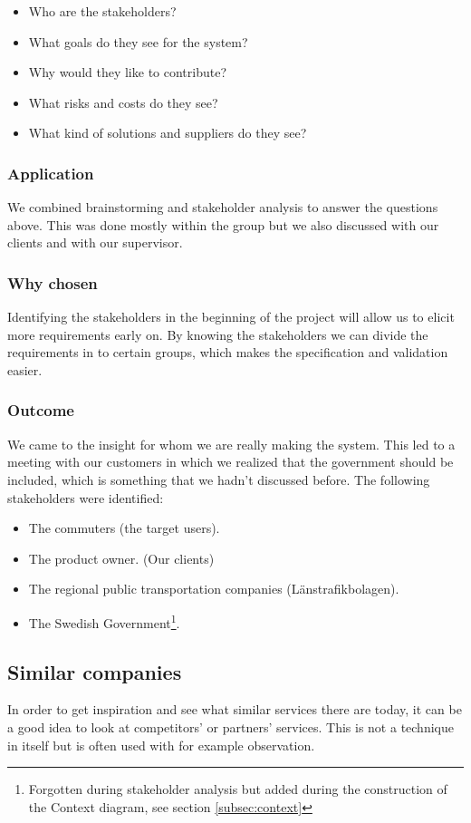 \documentclass[a4paper]{article}
\begin{document}
		\begin{itemize}
			\item Who are the stakeholders?
			\item What goals do they see for the system?
			\item Why would they like to contribute?
			\item What risks and costs do they see?
			\item What kind of solutions and suppliers do they see?
		\end{itemize}
		
		\subsubsection{Application}
 We combined brainstorming and stakeholder analysis to answer the questions above. This was done mostly within the group but we also discussed with our clients and with our supervisor.
		\subsubsection{Why chosen}
		Identifying the stakeholders in the beginning of the project will allow us to elicit more requirements early on. By knowing the stakeholders we can divide the requirements in to certain groups, which makes the specification and validation easier.
		\subsubsection{Outcome}
We came to the insight for whom we are really making the system. This led to a meeting with our customers in which we realized that the government should be included, which is something that we hadn't discussed before.
	The following stakeholders were identified:

		\begin{itemize}
			\item The commuters (the target users).
			\item The product owner. (Our clients)
			\item The regional public transportation companies (Länstrafikbolagen). 
			\item The Swedish Government\footnote{Forgotten during stakeholder analysis but added during the construction of the Context diagram, see section \ref{subsec:context}}.
		\end{itemize}
		
		\subsection{Similar companies}
			In order to get inspiration and see what similar services there are today, it can be a good idea to look at competitors' or partners' services. This is not a technique in itself but is often used with for example observation.
	
\end{document}
